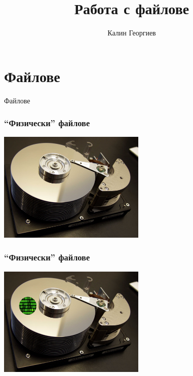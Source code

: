 \documentclass{beamer}
\begin{document}
\title[Увод в програмирането]{Работа с файлове} 
\author{Калин Георгиев}
\frame{\titlepage} 


\section{Файлове}


\begin{frame}
\centerline{Файлове}
\end{frame}


\begin{frame}[fragile]
\frametitle{``Физически'' файлове}


\begin{center}
   \includegraphics[width=7cm]{images/harddisk}
\end{center}

\end{frame}

\begin{frame}[fragile]
\frametitle{``Физически'' файлове}


\begin{center}
   \includegraphics[width=7cm]{images/harddisk-oneszeros}
\end{center}

\end{frame}
\end{document}
